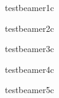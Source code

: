 \documentclass{beamer}
\begin{document}
\begin{frame}
  testbeamer1c \\ 
\end{frame}

\begin{frame}
  testbeamer2c \\ 
\end{frame}

\begin{frame}
  testbeamer3c \\ 
\end{frame}

\begin{frame}
  testbeamer4c \\ 
\end{frame}

\begin{frame}
  testbeamer5c \\ 
\end{frame}
\end{document}
